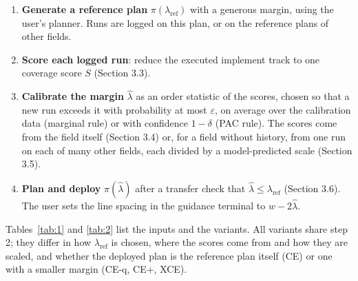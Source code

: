 \documentclass[preprint,12pt,authoryear]{elsarticle}
\providecommand{\tightlist}{\setlength{\itemsep}{0pt}\setlength{\parskip}{0pt}}
\begin{document}
\begin{enumerate}
\def\labelenumi{\arabic{enumi}.}
\tightlist
\item
  \textbf{Generate a reference plan} \(\pi(\lambda_\mathrm{ref})\) with a generous margin, using the user's planner. Runs are logged on this plan, or on the reference plans of other fields.
\item
  \textbf{Score each logged run}: reduce the executed implement track to one coverage score \(S\) (Section 3.3).
\item
  \textbf{Calibrate the margin} \(\hat\lambda\) as an order statistic of the scores, chosen so that a new run exceeds it with probability at most \(\varepsilon\), on average over the calibration data (marginal rule) or with confidence \(1-\delta\) (PAC rule). The scores come from the field itself (Section 3.4) or, for a field without history, from one run on each of many other fields, each divided by a model-predicted scale (Section 3.5).
\item
  \textbf{Plan and deploy} \(\pi(\hat\lambda)\) after a transfer check that \(\hat\lambda\le\lambda_\mathrm{ref}\) (Section 3.6). The user sets the line spacing in the guidance terminal to \(w-2\hat\lambda\).
\end{enumerate}

Tables~\ref{tab:1} and \ref{tab:2} list the inputs and the variants. All variants share step 2; they differ in how \(\lambda_\mathrm{ref}\) is chosen, where the scores come from and how they are scaled, and whether the deployed plan is the reference plan itself (CE) or one with a smaller margin (CE-q, CE+, XCE).
\end{document}
